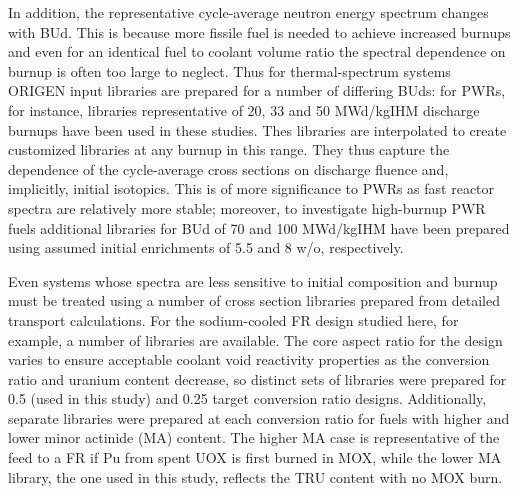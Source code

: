 In addition, the representative cycle-average neutron energy spectrum changes with BUd.  This is because 
more fissile fuel is needed to achieve increased burnups and even for an identical fuel to coolant volume 
ratio the spectral dependence on burnup is often too large to neglect.  Thus for thermal-spectrum systems 
ORIGEN input libraries are prepared for a number of differing BUds: for PWRs, for instance, libraries 
representative of 20, 33 and 50 MWd/kgIHM discharge burnups have been used in these studies.  Thes 
libraries are interpolated to create customized libraries at any burnup in this range.  They thus 
capture the dependence of the cycle-average cross sections on discharge fluence and, implicitly, 
initial isotopics.  This is of more significance to PWRs as fast reactor spectra are relatively more 
stable; moreover, to investigate high-burnup PWR fuels additional libraries for BUd of 70 and 100 MWd/kgIHM 
have been prepared using assumed initial  enrichments of 5.5 and 8 w/o, respectively.

Even systems whose spectra are less sensitive to initial composition and burnup must be treated using a 
number of cross section libraries prepared from detailed transport calculations.  For the sodium-cooled 
FR design studied here, for example, a number of libraries are available.  The core aspect ratio for the 
design varies to ensure acceptable coolant void reactivity properties as the conversion ratio and uranium 
content decrease, so distinct sets of libraries were prepared for 0.5 (used in this study) and 0.25 target 
conversion ratio designs.  Additionally, separate libraries were prepared at each conversion ratio for 
fuels with higher and lower minor actinide (MA) content.   The higher MA case is representative of the 
feed to a FR if Pu from spent UOX is first burned in MOX, while the lower MA library, the one used in 
this study, reflects the TRU content with no MOX burn.



